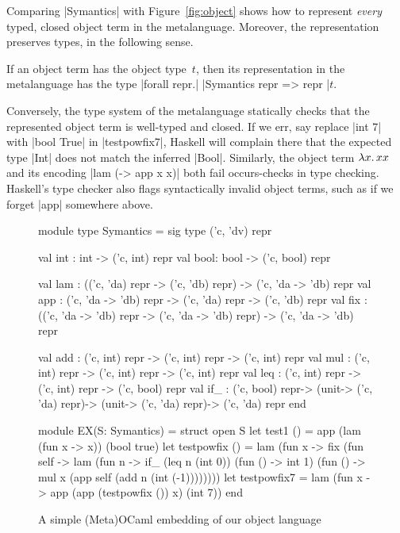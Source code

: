 Comparing |Symantics| with Figure~\ref{fig:object}
shows how to represent \emph{every} typed, closed object term in the
metalanguage. Moreover, the representation preserves types, in the following
sense.
\begin{proposition}
If an object term has the object type~$t$, then its
representation in the metalanguage has the type 
|forall repr.| |Symantics repr => repr |$t$.
\end{proposition}
Conversely, the type system of the metalanguage statically checks that the
represented object term is well-typed and closed.
If we err, say replace |int 7| with |bool True| in
|testpowfix7|, Haskell will complain there that the expected type |Int| does not
match the inferred |Bool|.  Similarly, the object term $\mathopen{\lambda\mathord{x}.\,}xx$ and its
encoding |lam (\x -> app x x)| both fail occurs-checks in type checking.
Haskell's type checker also flags syntactically invalid object terms, 
such as if we forget |app| somewhere above.

\begin{figure*}[t]
\begin{floatrule}
\begin{code}
module type Symantics = sig
  type ('c, 'dv) repr

  val int : int  -> ('c, int) repr
  val bool: bool -> ('c, bool) repr

  val lam : (('c, 'da) repr -> ('c, 'db) repr) -> ('c, 'da -> 'db) repr
  val app : ('c, 'da -> 'db) repr -> ('c, 'da) repr -> ('c, 'db) repr
  val fix : (('c, 'da -> 'db) repr -> ('c, 'da -> 'db) repr) -> ('c, 'da -> 'db) repr

  val add : ('c, int) repr -> ('c, int) repr -> ('c, int) repr
  val mul : ('c, int) repr -> ('c, int) repr -> ('c, int) repr
  val leq : ('c, int) repr -> ('c, int) repr -> ('c, bool) repr
  val if_ : ('c, bool) repr-> (unit-> ('c, 'da) repr)-> (unit-> ('c, 'da) repr)-> ('c, 'da) repr
end
\end{code}
\begin{code}
module EX(S: Symantics) = struct
  open S
  let test1 () = app (lam (fun x -> x)) (bool true)
  let testpowfix () =  lam (fun x -> fix (fun self -> lam (fun n ->
                         if_ (leq n (int 0)) (fun () -> int 1)
                             (fun () -> mul x (app self (add n (int (-1))))))))
  let testpowfix7 =  lam (fun x -> app (app (testpowfix ()) x) (int 7))
end
\end{code}
\end{floatrule}
\caption{A simple (Meta)OCaml embedding of our object language}
\label{fig:ocaml-simple}
\end{figure*}

